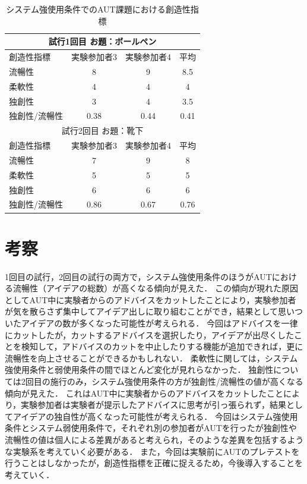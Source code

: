 \documentclass[a4paper]{jarticle}
\begin{document}
\begin{table}[h]
    \caption{システム強使用条件でのAUT課題における創造性指標}
    \label{table:strong}
    \centering
    \begin{tabular}{lccc}
      \hline
      \multicolumn{4}{c}{試行1回目 お題：ボールペン} \\
      \hline
      創造性指標  & 実験参加者3  &  実験参加者4  &  平均 \\
      \hline
      流暢性  & 8  & 9 & 8.5 \\
      柔軟性  & 4   & 4  & 4 \\
      独創性  & 3  & 4 & 3.5 \\
      独創性/流暢性  & 0.38 & 0.44 & 0.41 \\
      \hline
      \multicolumn{4}{c}{試行2回目 お題：靴下} \\
      \hline
      創造性指標  & 実験参加者3  &  実験参加者4  &  平均 \\
      \hline
      流暢性  & 7  & 9 & 8 \\
      柔軟性  & 5   & 5  & 5 \\
      独創性  & 6  & 6 & 6 \\
      独創性/流暢性  & 0.86 & 0.67 & 0.76 \\
      \hline
    \end{tabular}
\end{table}

\section{考察}
1回目の試行，2回目の試行の両方で，システム強使用条件のほうがAUTにおける流暢性（アイデアの総数）が高くなる傾向が見えた．
この傾向が現れた原因としてAUT中に実験者からのアドバイスをカットしたことにより，実験参加者が気を散らさず集中してアイデア出しに取り組むことができ，結果として思いついたアイデアの数が多くなった可能性が考えられる．
今回はアドバイスを一律にカットしたが，カットするアドバイスを選択したり，アイデアが出尽くしたことを検知して，アドバイスのカットを中止したりする機能が追加できれば，更に流暢性を向上させることができるかもしれない．
柔軟性に関しては，システム強使用条件と弱使用条件の間でほとんど変化が見れらなかった．
独創性については2回目の施行のみ，システム強使用条件の方が独創性/流暢性の値が高くなる傾向が見えた．
これはAUT中に実験者からのアドバイスをカットしたことにより，実験参加者は実験者が提示したアドバイスに思考が引っ張られず，結果としてアイデアの独自性が高くなった可能性が考えられる．
今回はシステム強使用条件とシステム弱使用条件で，それぞれ別の参加者がAUTを行ったが独創性や流暢性の値は個人による差異があると考えられ，そのような差異を包括するような実験系を考えていく必要がある．
また，今回は実験前にAUTのプレテストを行うことはしなかったが，創造性指標を正確に捉えるため，今後導入することを考えていく．
\end{document}
